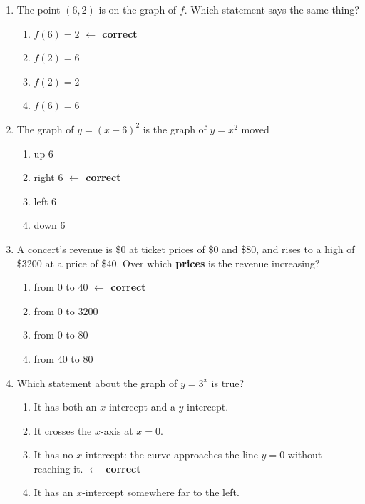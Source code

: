 \begin{enumerate}[leftmargin=1.8em, itemsep=6pt, topsep=5pt]
\small

\item The point $(6,2)$ is on the graph of $f$. Which statement says the same thing?
\begin{enumerate}[label=(\Alph*), leftmargin=2.2em, itemsep=1pt, topsep=2pt]
  \item $f(6)=2$ \quad \textcolor{keyred}{\textbf{$\leftarrow$ correct}}
  \item $f(2)=6$
  \item $f(2)=2$
  \item $f(6)=6$
\end{enumerate}

\item The graph of $y=(x-6)^2$ is the graph of $y=x^2$ moved
\begin{enumerate}[label=(\Alph*), leftmargin=2.2em, itemsep=1pt, topsep=2pt]
  \item up $6$
  \item right $6$ \quad \textcolor{keyred}{\textbf{$\leftarrow$ correct}}
  \item left $6$
  \item down $6$
\end{enumerate}

\item A concert's revenue is \$0 at ticket prices of \$0 and \$80, and rises to a high of \$3200 at
a price of \$40. Over which \textbf{prices} is the revenue increasing?
\begin{enumerate}[label=(\Alph*), leftmargin=2.2em, itemsep=1pt, topsep=2pt]
  \item from $0$ to $40$ \quad \textcolor{keyred}{\textbf{$\leftarrow$ correct}}
  \item from $0$ to $3200$
  \item from $0$ to $80$
  \item from $40$ to $80$
\end{enumerate}

\item Which statement about the graph of $y=3^x$ is true?
\begin{enumerate}[label=(\Alph*), leftmargin=2.2em, itemsep=1pt, topsep=2pt]
  \item It has both an $x$-intercept and a $y$-intercept.
  \item It crosses the $x$-axis at $x=0$.
  \item It has no $x$-intercept: the curve approaches the line $y=0$ without reaching it.
        \quad \textcolor{keyred}{\textbf{$\leftarrow$ correct}}
  \item It has an $x$-intercept somewhere far to the left.
\end{enumerate}


\end{enumerate}
